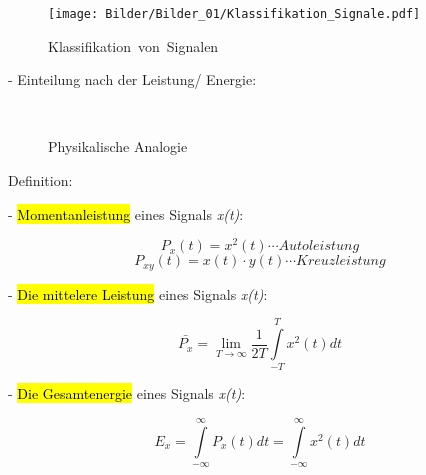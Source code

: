 \begin{figure}[H]
\centering
\texttt{[image: Bilder/Bilder\_01/Klassifikation\_Signale.pdf]}
\caption{Klassifikation\ von\ Signalen}
\label{fig:env}
\end{figure}

\hspace{1em} - Einteilung nach der Leistung/ Energie:\par

\begin{figure}[H]
    \centering
    \subfigbottomskip=10pt
    \subfigcapskip=-3pt
	  \\
	\caption{Physikalische Analogie}
\end{figure}
\hspace{1em} Definition:\par
\hspace{2em} - \hl {Momentanleistung} eines Signals {\itshape x(t)}:\par

\begin{equation}
    P_{x} (t)=x^{2} (t) \cdots Autoleistung
\end{equation}
\begin{equation}
    P_{xy} (t)=x(t)\cdot y(t) \cdots Kreuzleistung
\end{equation}

\hspace{2em} - \hl {Die mittelere Leistung} eines Signals {\itshape x(t)}:\par
\begin{equation}
    \bar{P_{x}} =\lim_{T \to \infty} \frac{1}{2T} \int\limits_{-T}^{T} x^{2} (t)dt
\end{equation}

\hspace{2em} - \hl {Die Gesamtenergie} eines Signals {\itshape x(t)}:\par
\begin{equation}
    E_{x}=\int\limits_{-\infty }^{\infty} P_{x} (t)dt=\int\limits_{-\infty}^{\infty}x^{2} (t)dt
\end{equation}


